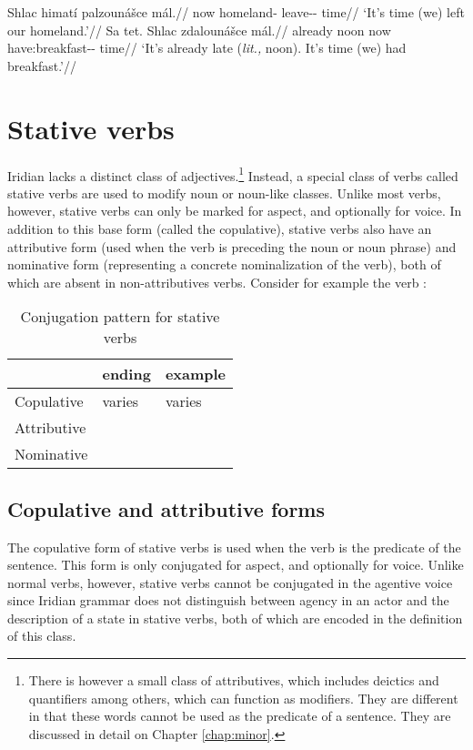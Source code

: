 \pex
\begingl
\gla Shlac himatí palzounášce mál.//
\glb now homeland-\Gen{} leave-\Lv{}-\SupN{} time//
\glft `It's time (we) left our homeland.'//
\endgl
\xe
\pex
\begingl
\gla Sa tet. Shlac zdalounášce mál.//
\glb already noon now have:breakfast-\Lv{}-\SupN{} time//
\glft `It's already late (\emph{lit.,} noon). It's time (we) had breakfast.'//
\endgl
\xe

\section{Stative verbs}\label{sec:statives}

Iridian lacks a distinct class of adjectives.\footnote{There is however a small class of attributives, which includes deictics and quantifiers among others, which can function as modifiers. They are different in that these words cannot be used as the predicate of a sentence. They are discussed in detail on Chapter \ref{chap:minor}.} Instead, a special class of verbs called {\cscaps stative verbs} are used to modify noun or noun-like classes. Unlike most verbs, however, stative verbs can only be marked for aspect, and optionally for voice. In addition to this base form (called the {\cscaps copulative}), stative verbs also have an {\cscaps attributive} form (used when the verb is preceding the noun or noun phrase) and {\cscaps nominative} form (representing a concrete nominalization of the verb), both of which are absent in non-attributives verbs. Consider for example the verb  :

\begin{table}[h!]
	\small
	\caption{Conjugation pattern for stative verbs}
	\medskip
	\begin{tabu} to 0.7\textwidth{YY[0.8]Y}
		\toprule
		&{\cscaps ending}&{\cscaps example}\\
		\midrule
		Copulative & varies & varies\\
		Attributive &  & \\
		Nominative & 	& \\
		\bottomrule
	\end{tabu}
\end{table}

\subsection{Copulative and attributive forms}
The copulative form of stative verbs is used when the verb is the predicate of the sentence. This form is only conjugated for aspect, and optionally for voice. Unlike normal verbs, however, stative verbs cannot be conjugated in the agentive voice since Iridian grammar does not distinguish between agency in an actor and the description of a state in stative verbs, both of which are encoded in the definition of this class. 

